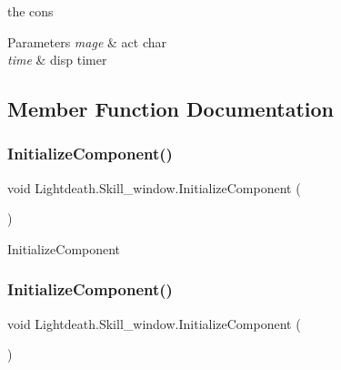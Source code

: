 the cons 


\begin{DoxyParams}{Parameters}
{\em mage} & act char\\
\hline
{\em time} & disp timer\\
\hline
\end{DoxyParams}


\subsection{Member Function Documentation}
\hypertarget{class_lightdeath_1_1_skill__window_ae0fbf1b9b98474974dfaa685f29a1bd2}{}\label{class_lightdeath_1_1_skill__window_ae0fbf1b9b98474974dfaa685f29a1bd2} 
\subsubsection{\texorpdfstring{Initialize\+Component()}{InitializeComponent()}\hspace{0.1cm}{\footnotesize\ttfamily [1/2]}}
{\footnotesize\ttfamily void Lightdeath.\+Skill\+\_\+window.\+Initialize\+Component (\begin{DoxyParamCaption}{ }\end{DoxyParamCaption})\hspace{0.3cm}{\ttfamily [inline]}}



Initialize\+Component 

\hypertarget{class_lightdeath_1_1_skill__window_ae0fbf1b9b98474974dfaa685f29a1bd2}{}\label{class_lightdeath_1_1_skill__window_ae0fbf1b9b98474974dfaa685f29a1bd2} 
\subsubsection{\texorpdfstring{Initialize\+Component()}{InitializeComponent()}\hspace{0.1cm}{\footnotesize\ttfamily [2/2]}}
{\footnotesize\ttfamily void Lightdeath.\+Skill\+\_\+window.\+Initialize\+Component (\begin{DoxyParamCaption}{ }\end{DoxyParamCaption})\hspace{0.3cm}{\ttfamily [inline]}}



